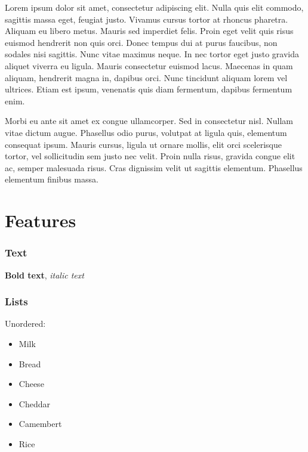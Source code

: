 Lorem ipsum dolor sit amet, consectetur adipiscing elit. Nulla quis elit commodo, sagittis massa eget, feugiat justo. Vivamus cursus tortor at rhoncus pharetra. Aliquam eu libero metus. Mauris sed imperdiet felis. Proin eget velit quis risus euismod hendrerit non quis orci. Donec tempus dui at purus faucibus, non sodales nisi sagittis. Nunc vitae maximus neque. In nec tortor eget justo gravida aliquet viverra eu ligula. Mauris consectetur euismod lacus. Maecenas in quam aliquam, hendrerit magna in, dapibus orci. Nunc tincidunt aliquam lorem vel ultrices. Etiam est ipsum, venenatis quis diam fermentum, dapibus fermentum enim.

Morbi eu ante sit amet ex congue ullamcorper. Sed in consectetur nisl. Nullam vitae dictum augue. Phasellus odio purus, volutpat at ligula quis, elementum consequat ipsum. Mauris cursus, ligula ut ornare mollis, elit orci scelerisque tortor, vel sollicitudin sem justo nec velit. Proin nulla risus, gravida congue elit ac, semper malesuada risus. Cras dignissim velit ut sagittis elementum. Phasellus elementum finibus massa.

\chapter{Features}
\label{features}

\subsection{Text}
\label{text}

\textbf{Bold text}, \emph{italic text}

\subsection{Lists}
\label{lists}

Unordered:

\begin{itemize}
\item Milk

\item Bread

\item Cheese

\item Cheddar

\item Camembert

\item Rice

\end{itemize}

